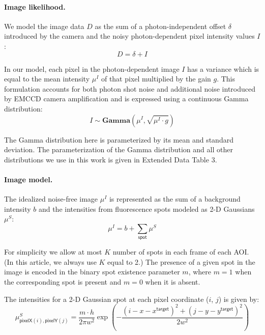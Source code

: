 

\paragraph{Image likelihood.} We model the image data $D$ as the sum of a photon-independent offset $\delta$ introduced by the camera and the noisy photon-dependent pixel intensity values $I$:
%
\begin{equation}
    D = \delta + I
\end{equation}

In our model, each pixel in the photon-dependent image $I$ has a  variance which is equal to  the mean intensity $\mu^I$ of that pixel multiplied by the gain $g$. This formulation accounts for both photon shot noise and additional noise introduced by EMCCD camera amplification \cite{Van_Vliet1998-jk} and is expressed using a continuous Gamma distribution:
%
\begin{equation}
    I \sim \mathbf{Gamma} (\mu^I, \sqrt{\mu^I \cdot g})
\end{equation}

The Gamma distribution here is parameterized by its mean and standard deviation. The parameterization of the Gamma distribution and all other distributions we use in this work is given in Extended Data Table 3.

\paragraph{Image model.} The idealized noise-free image $\mu^I$ is represented  as the sum of a background intensity $b$ and the intensities from fluorescence spots modeled as  2-D Gaussians $\mu^S$:
%
\begin{equation}
    \mu^I = b + \sum_{\mathsf{spot}} \mu^S
\end{equation}

\noindent
For simplicity we allow at most $K$ number of spots in each frame of each AOI.  (In this article, we always use $K$ equal to 2.)  The presence of a given spot in the image is encoded in the binary spot existence parameter $m$, where $m = 1$ when the corresponding spot is present and $m = 0$ when it is absent.

The intensities for a 2-D Gaussian spot at each pixel coordinate ($i$, $j$) is given by:
%
\begin{equation}
    \mu^S_{\mathsf{pixelX}(i), \mathsf{pixelY}(j)} = \dfrac{m \cdot h}{2 \pi w^2} \exp{\left( -\dfrac{(i-x-x^\mathsf{target})^2 + (j-y-y^\mathsf{target})^2}{2 w^2} \right)}
\end{equation}

